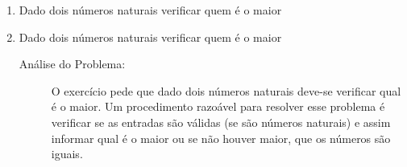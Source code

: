 \documentclass[a4paper, 12pt]{article}
\begin{document}
\begin{enumerate}
  \item Dado dois números naturais verificar quem é o maior
    \begin{description}
      
    \end{description}
  \item Dado dois números naturais verificar quem é o maior
    \begin{description}
      \item[Análise do Problema:] O exercício pede que dado dois números naturais deve-se verificar qual é o maior.
Um procedimento razoável para resolver esse problema é verificar se as entradas são válidas (se são números naturais) e assim informar qual é o maior ou se não houver maior, que os números são iguais. 


\end{description}
\end{enumerate}
\end{document}
